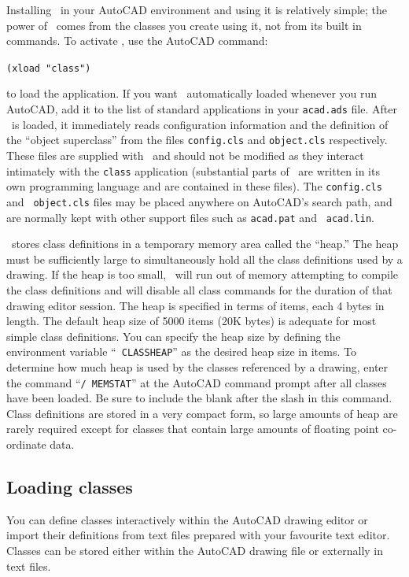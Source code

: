 \documentclass{article}
\begin{document}
Installing \cw\ in your AutoCAD environment and using it is relatively
simple; the power of \cw\ comes from the classes you create using it,
not from its built in commands.  To activate \cw , use
the AutoCAD command:

\verb+(xload "class")+

to load the application.  If you want \cw\ automatically loaded
whenever you run AutoCAD, add it to the list of standard applications
in your {\tt acad.ads} file.  After \cw\ is loaded, it immediately
reads configuration information and the definition of the ``object
superclass'' from the files {\tt config.cls} and {\tt object.cls}
respectively.  These files are supplied with \cw\ and should not be
modified as they interact intimately with the {\tt class} application
(substantial parts of \cw\ are written in its own programming language
and are contained in these files).  The {\tt config.cls} and {\tt
object.cls} files may be placed anywhere on AutoCAD's search path, and are
normally kept with other support files such as {\tt acad.pat} and {\tt
acad.lin}.

\cw\ stores class definitions in a temporary memory area called the
``heap.'' The heap must be sufficiently large to simultaneously hold
all the class definitions used by a drawing.  If the heap is too
small, \cw\ will run out of memory attempting to compile the class
definitions and will disable all class commands for the duration
of that drawing editor session.  The heap is specified in terms of
items, each 4 bytes in length.  The default heap size of 5000 items
(20K bytes) is adequate for most simple class definitions.  You
can specify the heap size by defining the environment variable ``{\tt
CLASSHEAP}'' as the desired heap size in items.  To determine how much
heap is used by the classes referenced by a drawing, enter the command
``{\tt /~MEMSTAT}'' at the AutoCAD command prompt after all classes
have been loaded.  Be sure to include the blank after the slash in
this command.  Class definitions are stored in a very compact form, so
large amounts of heap are rarely required except for classes that
contain large amounts of floating point co-ordinate data.

\subsection{Loading classes}

You can define classes interactively within the AutoCAD drawing editor
or import their definitions from text files prepared with your
favourite text editor.  Classes can be stored either within the
AutoCAD drawing file or externally in text files.
\end{document}
